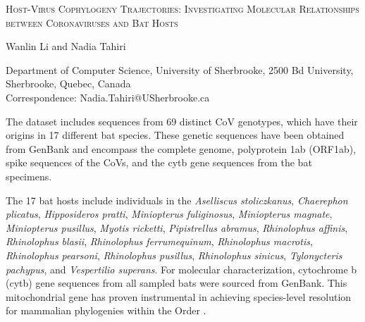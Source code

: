 \documentclass[9pt]{article}
\begin{document}
\textsc{Host-Virus Cophylogeny Trajectories: Investigating Molecular Relationships between Coronaviruses and Bat Hosts\\}

\begin{center}
    Wanlin Li and Nadia Tahiri \\
\end{center}

\begin{center}
Department of Computer Science, University of Sherbrooke, 2500 Bd University, Sherbrooke, Quebec, Canada \\
Correspondence: Nadia.Tahiri@USherbrooke.ca\\
\end{center}

The dataset includes sequences from 69 distinct CoV genotypes, which have their origins in 17 different bat species. These genetic sequences have been obtained from GenBank and encompass the complete genome, polyprotein 1ab (ORF1ab), spike sequences of the CoVs, and the cytb gene sequences from the bat specimens.

The 17 bat hosts include individuals in the \emph{Aselliscus stoliczkanus}, \emph{Chaerephon plicatus}, \emph{Hipposideros pratti}, \emph{Miniopterus fuliginosus}, \emph{Miniopterus magnate}, \emph{Miniopterus pusillus}, \emph{Myotis ricketti}, \emph{Pipistrellus abramus}, \emph{Rhinolophus affinis}, \emph{Rhinolophus blasii}, \emph{Rhinolophus ferrumequinum}, \emph{Rhinolophus macrotis}, \emph{Rhinolophus pearsoni}, \emph{Rhinolophus pusillus}, \emph{Rhinolophus sinicus}, \emph{Tylonycteris pachypus}, and \emph{Vespertilio superans}. For molecular characterization, cytochrome b (cytb) gene sequences from all sampled bats were sourced from GenBank. This mitochondrial gene has proven instrumental in achieving species-level resolution for mammalian phylogenies within the Order \cite{agnarsson2011time, bradley2001test, kocher1989dynamics}.
\end{document}
